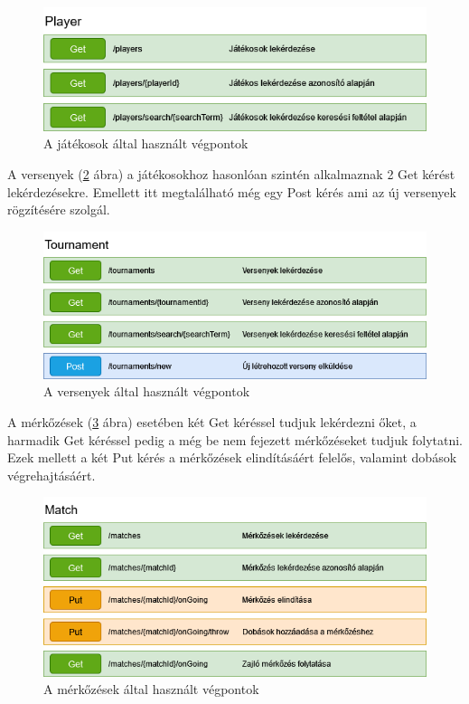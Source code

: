 \begin{figure}[h]
\centering
\includegraphics[scale=0.6]{images/Player_Vegpontok.drawio.png}
\caption{A játékosok által használt végpontok}
\label{fig:playerEndpoint}
\end{figure}

A versenyek (\ref{fig:tournamentEndpoint} ábra) a játékosokhoz hasonlóan szintén alkalmaznak 2 Get kérést lekérdezésekre. Emellett itt megtalálható még egy Post kérés ami az új versenyek rögzítésére szolgál.

\begin{figure}[h]
\centering
\includegraphics[scale=0.6]{images/Tournament_Vegpontok.drawio.png}
\caption{A versenyek által használt végpontok}
\label{fig:tournamentEndpoint}
\end{figure}

A mérkőzések (\ref{fig:matchEndpoint} ábra) esetében két Get kéréssel tudjuk lekérdezni őket, a harmadik Get kéréssel pedig a még be nem fejezett mérkőzéseket tudjuk folytatni. Ezek mellett a két Put kérés a mérkőzések elindításáért felelős, valamint dobások végrehajtásáért.

\begin{figure}[h]
\centering
\includegraphics[scale=0.6]{images/Merkozes_Vegpontok.drawio.png}
\caption{A mérkőzések által használt végpontok}
\label{fig:matchEndpoint}
\end{figure}